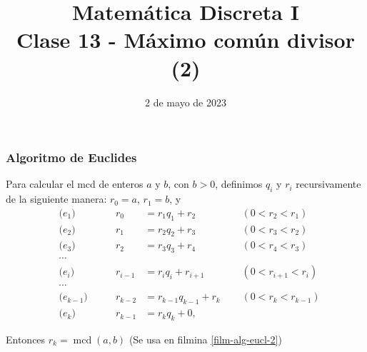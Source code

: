 \documentclass[handout]{beamer} %
\title[Clase 12 - MCD (2)]{Matemática Discreta I \\ Clase 13 - Máximo común divisor (2)}
\institute[]{\normalsize FAMAF / UNC
    \\[\baselineskip] ${}^{}$
    \\[\baselineskip]
}
\date[02/05/2023]{2 de mayo  de 2023}
\newcommand{\mcd}{\operatorname{mcd}}
\begin{document}
    
    \frame{\titlepage} 
    
    
    
    \begin{frame}\frametitle{Algoritmo de Euclides}\label{film-alg-eucl}
        Para calcular el mcd de enteros $a$ y $b$, con $b >0$, 
        definimos $q_i$ y $r_i$ recursivamente  de la siguiente manera: $r_0 = a$, $r_1 = b$,  y \pause
        \begin{align*}
            &\text{($e_{1}$)}\qquad& r_0&=r_1 q_1 + r_2& &(0 < r_2<r_1)\\
            &\text{($e_{2}$)}\qquad& r_1&=r_2q_2 + r_3\quad{}\quad{}\quad{}& &(0 < r_3<r_2)  \\
            &\text{($e_{3}$)}\qquad& r_2&=r_3q_3 + r_4\quad{}\quad{}\quad{}& &(0 < r_4<r_3)  \\
            &\cdots&&\\
            &\text{($e_{i}$)}\qquad& r_{i-1}&=r_{i}q_{i} + r_{i+1}& &(0 < r_{i+1} <r_{i}) \\
            &\cdots&& \\
            &\text{($e_{k-1}$)}\qquad& r_{k-2}&=r_{k-1}q_{k-1} + r_{k}& &(0 < r_{k} <r_{k-1}) \\
            &\text{($e_{k}$)}\qquad& r_{k-1}&=r_{k}q_{k} + 0 ,&&  
        \end{align*}\pause
        
        Entonces $r_k = \mcd(a,b)$ {\color{gray} \qquad (Se usa en filmina \ref{film-alg-eucl-2})}
    \end{frame}

    

\end{document}

